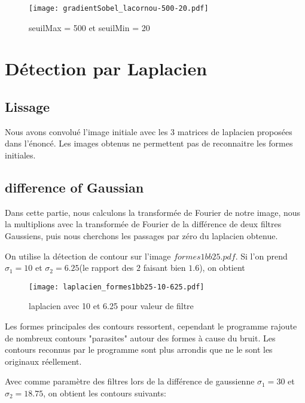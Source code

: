 \documentclass[12pt]{article}
\numberwithin{equation}{section}
\begin{document}
	\begin{figure}[!ht]
        \begin{center}
           \texttt{[image: gradientSobel\_lacornou-500-20.pdf]} 
           \caption{seuilMax = 500 et seuilMin = 20}
        \end{center}
    \end{figure}

\section{Détection par Laplacien}

\subsection{Lissage}

Nous avons convolué l'image initiale avec les $3$ matrices de laplacien proposées dans l'énoncé. Les images obtenus ne permettent pas de reconnaitre les formes initiales. 

\subsection{difference of Gaussian}

Dans cette partie, nous calculons la transformée de Fourier de notre image, nous la multiplions avec la transformée de Fourier de la différence de deux filtres Gaussiens, puis nous cherchons les passages par zéro du laplacien obtenue. 

On utilise la détection de contour sur l'image $formes1bb25.pdf$. Si l'on prend $\sigma_1=10$ et $\sigma_2=6.25$(le rapport des $2$ faisant bien $1.6$), on obtient

	\begin{figure}[!ht]
        \begin{center}
           \texttt{[image: laplacien\_formes1bb25-10-625.pdf]} 
           \caption{laplacien avec 10 et 6.25 pour valeur de filtre}
        \end{center}
    \end{figure}

Les formes principales des contours ressortent, cependant le programme rajoute de nombreux contours "parasites" autour des formes à cause du bruit. Les contours reconnus par le programme sont plus arrondis que ne le sont les originaux réellement.

Avec comme paramètre des filtres lors de la différence de gaussienne $\sigma_1=30$ et $\sigma_2=18.75$, on obtient les contours suivants:
\end{document}

